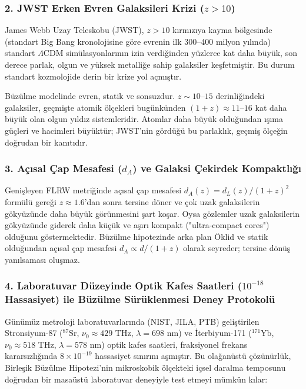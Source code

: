 \subsubsection{2. JWST Erken Evren Galaksileri Krizi (\texorpdfstring{$z > 10$}{z > 10})}
James Webb Uzay Teleskobu (JWST), $z > 10$ kırmızıya kayma bölgesinde (standart Big Bang kronolojisine göre evrenin ilk 300--400 milyon yılında) standart $\Lambda$CDM simülasyonlarının izin verdiğinden yüzlerce kat daha büyük, son derece parlak, olgun ve yüksek metalliğe sahip galaksiler keşfetmiştir. Bu durum standart kozmolojide derin bir krize yol açmıştır.

Büzülme modelinde evren, statik ve sonsuzdur. $z \sim 10\text{--}15$ derinliğindeki galaksiler, geçmişte atomik ölçekleri bugünkünden $(1+z) \approx 11\text{--}16$ kat daha büyük olan olgun yıldız sistemleridir. Atomlar daha büyük olduğundan ışıma güçleri ve hacimleri büyüktür; JWST'nin gördüğü bu parlaklık, geçmiş ölçeğin doğrudan bir kanıtıdır.

\subsubsection{3. Açısal Çap Mesafesi (\texorpdfstring{$d_A$}{dA}) ve Galaksi Çekirdek Kompaktlığı}
Genişleyen FLRW metriğinde açısal çap mesafesi $d_A(z) = d_L(z) / (1+z)^2$ formülü gereği $z \approx 1.6$'dan sonra tersine döner ve çok uzak galaksilerin gökyüzünde daha büyük görünmesini şart koşar. Oysa gözlemler uzak galaksilerin gökyüzünde giderek daha küçük ve aşırı kompakt ("ultra-compact cores") olduğunu göstermektedir. Büzülme hipotezinde arka plan Öklid ve statik olduğundan açısal çap mesafesi $d_A \propto d / (1+z)$ olarak seyreder; tersine dönüş yanılsaması oluşmaz.

\subsubsection{4. Laboratuvar Düzeyinde Optik Kafes Saatleri (\texorpdfstring{$10^{-18}$}{10^-18} Hassasiyet) ile Büzülme Sürüklenmesi Deney Protokolü}
\label{sec:optik_kafes_protokol}
Günümüz metroloji laboratuvarlarında (NIST, JILA, PTB) geliştirilen Stronsiyum-87 ($^{87}\mathrm{Sr}$, $\nu_0 \approx 429\text{ THz}$, $\lambda = 698\text{ nm}$) ve İterbiyum-171 ($^{171}\mathrm{Yb}$, $\nu_0 \approx 518\text{ THz}$, $\lambda = 578\text{ nm}$) optik kafes saatleri, fraksiyonel frekans kararsızlığında $8 \times 10^{-19}$ hassasiyet sınırını aşmıştır. Bu olağanüstü çözünürlük, Birleşik Büzülme Hipotezi'nin mikroskobik ölçekteki içsel daralma temposunu doğrudan bir masaüstü laboratuvar deneyiyle test etmeyi mümkün kılar:

